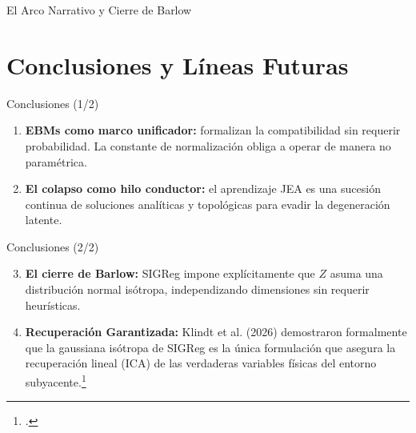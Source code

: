 \documentclass[aspectratio=169, 12pt]{beamer}
\begin{document}
\begin{frame}{El Arco Narrativo y Cierre de Barlow}
{%
}
\end{frame}

\section{Conclusiones y Líneas Futuras}

\begin{frame}{Conclusiones (1/2)}
\begin{enumerate}
  \item \textbf{EBMs como marco unificador:} formalizan la compatibilidad sin requerir probabilidad. La constante de normalización obliga a operar de manera no paramétrica.
  \item \textbf{El colapso como hilo conductor:} el aprendizaje JEA es una sucesión continua de soluciones analíticas y topológicas para evadir la degeneración latente.
\end{enumerate}
\end{frame}

\begin{frame}{Conclusiones (2/2)}
\begin{enumerate}
  \setcounter{enumi}{2}
  \item \textbf{El cierre de Barlow:} SIGReg impone explícitamente que $Z$ asuma una distribución normal isótropa, independizando dimensiones sin requerir heurísticas.
  \item \textbf{Recuperación Garantizada:} Klindt et al. (2026) demostraron formalmente que la gaussiana isótropa de SIGReg es la única formulación que asegura la recuperación lineal (ICA) de las verdaderas variables físicas del entorno subyacente.\footcite{klindt2026lejepa}
\end{enumerate}
\end{frame}
\end{document}
